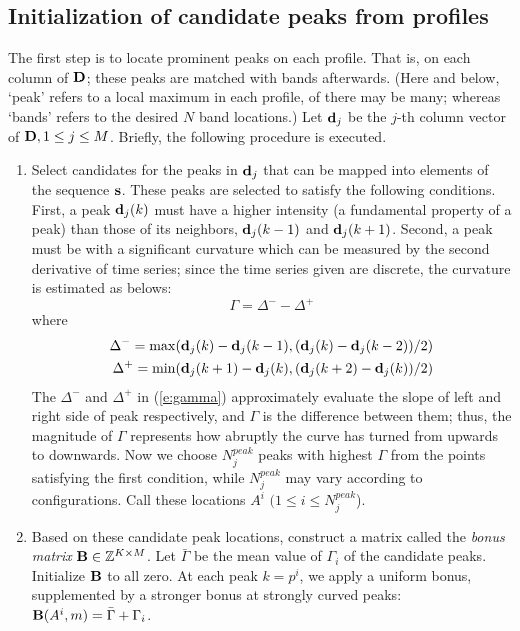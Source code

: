 \subsection{Initialization of candidate peaks from profiles}\label{ss:preproc}
The first step is to locate prominent peaks on each profile. That is, on each column of ${\mathbf{D}}$; these peaks are matched with bands afterwards. (Here and below, `peak' refers to a local maximum in each profile, of there may be many; whereas `bands' refers to the desired $N$ band locations.) Let ${\mathbf{d}}_j$ be the $j$-th column vector of ${\mathbf{D}}, 1 \le j \le M$. Briefly, the following procedure is executed.
%
\begin{enumerate}
\item Select candidates for the peaks in ${\mathbf{d}}_j$ that can be mapped into elements of the sequence ${\mathbf{s}}$. These peaks are selected to satisfy the following conditions. First, a peak ${\mathbf{d}}_j(k)$ must have a higher intensity (a fundamental property of a peak) than those of its neighbors, ${\mathbf{d}}_j(k-1)$ and ${\mathbf{d}}_j(k+1)$. Second, a peak must be with a significant curvature which can be measured by the second derivative of time series; since the time series given are discrete, the curvature is estimated as belows:
%
\begin{equation}\label{e:gamma}
\Gamma = \Delta^- - \Delta^+
\end{equation}
%
where
%
\begin{eqnarray}
\Delta^- = \max( {\mathbf{d}}_j(k)-{\mathbf{d}}_j(k-1), {{({\mathbf{d}}_j(k)-{\mathbf{d}}_j(k-2))}/{2}}) \nonumber \\
\Delta^+ = \min( {\mathbf{d}}_j(k+1)-{\mathbf{d}}_j(k), {{({\mathbf{d}}_j(k+2)-{\mathbf{d}}_j(k))}/{2}}) \nonumber
\end{eqnarray}
%
The $\Delta^-$ and $\Delta^+$ in (\ref{e:gamma}) approximately evaluate the slope of left and right side of peak respectively, and $\Gamma$ is the difference between them; thus, the magnitude of $\Gamma$ represents how abruptly the curve has turned from upwards to downwards. Now we choose $N^{peak}_j$ peaks with highest $\Gamma$ from the points satisfying the first condition, while $N^{peak}_j$ may vary according to configurations. Call these locations $A^i$ $(1 \le i \le N^{peak}_j$). 

\item Based on these candidate peak locations, construct a matrix called the \emph{bonus matrix} ${\mathbf{B}} \in \mathbb{Z}^{K \times M}$. Let $\bar{\Gamma}$ be the mean value of $\Gamma_i$ of the candidate peaks. Initialize ${\mathbf{B}}$ to all zero. At each peak $k = p^i$, we apply a uniform bonus, supplemented by a stronger bonus at strongly curved peaks: ${\mathbf{B}}(A^i,m) = \bar{\Gamma} + \Gamma_i$.


\end{enumerate}
